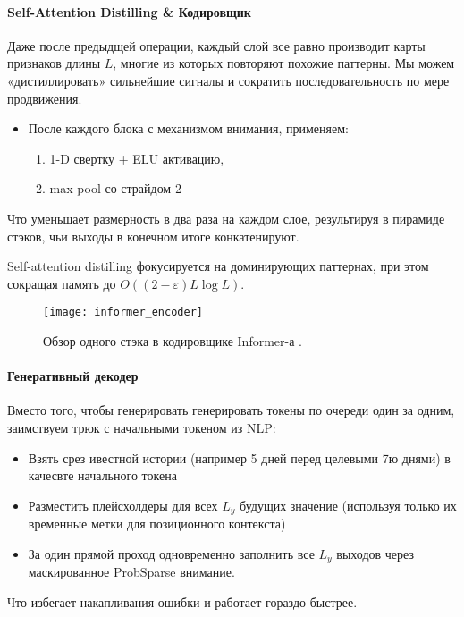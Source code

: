 \paragraph{Self-Attention Distilling \& Кодировщик}

Даже после предыдщей операции, каждый слой все равно производит 
карты признаков длины $L$, многие из которых повторяют похожие паттерны. 
Мы можем «дистиллировать» сильнейшие сигналы и сократить последовательность 
по мере продвижения.

\begin{itemize}
    \item После каждого блока с механизмом внимания, применяем:
    \begin{enumerate}
        \item 1-D свертку + ELU активацию, 
        \item max-pool со страйдом 2 
    \end{enumerate}
\end{itemize}
Что уменьшает размерность в два раза на каждом слое, результируя 
в пирамиде стэков, чьи выходы в конечном итоге конкатенируют. 

Self-attention distilling фокусируется на доминирующих паттернах, 
при этом сокращая память до $O((2-\varepsilon)L \log L)$.

\begin{figure}[h!]
    \centering
    \texttt{[image: informer\_encoder]}
    \caption{Обзор одного стэка в кодировщике Informer-а \cite{informer}.}
    \label{fig:informer_encoder}
\end{figure}

\paragraph{Генеративный декодер}

Вместо того, чтобы генерировать генерировать токены по очереди 
один за одним, заимствуем трюк с начальными токеном из NLP:
\begin{itemize}
    \item Взять срез ивестной истории (например 5 дней перед целевыми 7ю днями) в качесвте начального токена
    \item Разместить плейсхолдеры для всех $L_y$ будущих значение (используя только их временные метки для позиционного контекста)
    \item За один прямой проход одновременно заполнить все $L_y$ выходов через маскированное ProbSparse внимание.
\end{itemize} 
Что избегает накапливания ошибки и работает гораздо быстрее.

